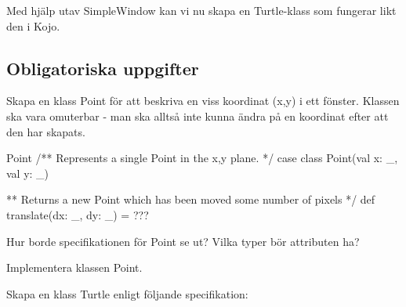Med hjälp utav SimpleWindow kan vi nu skapa en Turtle-klass som fungerar likt den i Kojo. 

\subsection{Obligatoriska uppgifter}

\Task Skapa en klass Point för att beskriva en viss koordinat (x,y) i ett fönster. Klassen ska vara omuterbar - man ska alltså inte kunna ändra på en koordinat efter att den har skapats.

\begin{ScalaSpec}{Point}
/** Represents a single Point in the x,y plane. */
case class Point(val x: _, val y: _) {

** Returns a new Point which has been moved some number of pixels */
def translate(dx: _, dy: _) = ???
}
\end{ScalaSpec}

\Subtask Hur borde specifikationen för Point se ut? Vilka typer bör attributen ha?

\Subtask Implementera klassen Point.




\Task Skapa en klass Turtle enligt följande specifikation:

